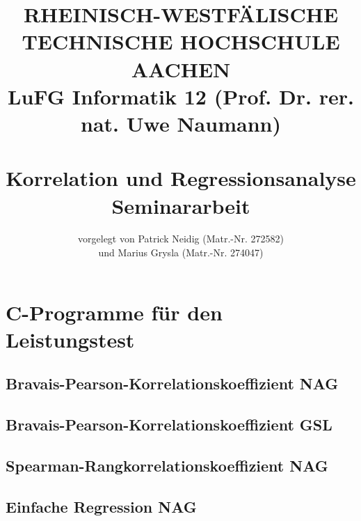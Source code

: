 \documentclass{article}
\title{
{\bf \scriptsize RHEINISCH-WESTF\"ALISCHE TECHNISCHE HOCHSCHULE AACHEN \\
LuFG Informatik 12 (Prof. Dr. rer. nat. Uwe Naumann)}
\vspace{.5cm} \\
\epsfig{file=figures/STCE_Logo_WWW.eps,width=.7\textwidth}
\vspace{1cm} \\
{\bf \Large Korrelation und Regressionsanalyse} \\
{\large Seminararbeit} 
}
\author{vorgelegt von Patrick Neidig (Matr.-Nr. 272582)\\
	und Marius Grysla (Matr.-Nr. 274047)}
\begin{document}


\pagestyle{headings}

\maketitle

\newpage
\tableofcontents

\newpage














\appendix

\lstset{basicstyle=\tiny, numberstyle=\tiny}

\section{C-Programme für den Leistungstest}

\subsection{Bravais-Pearson-Korrelationskoeffizient NAG}


\subsection{Bravais-Pearson-Korrelationskoeffizient GSL}


\subsection{Spearman-Rangkorrelationskoeffizient NAG}


\subsection{Einfache Regression NAG}

\end{document}

